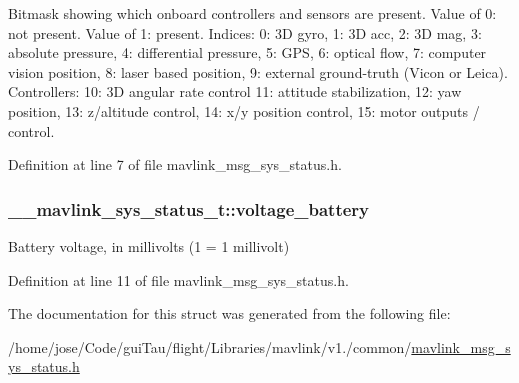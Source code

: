 Bitmask showing which onboard controllers and sensors are present. Value of 0\-: not present. Value of 1\-: present. Indices\-: 0\-: 3\-D gyro, 1\-: 3\-D acc, 2\-: 3\-D mag, 3\-: absolute pressure, 4\-: differential pressure, 5\-: G\-P\-S, 6\-: optical flow, 7\-: computer vision position, 8\-: laser based position, 9\-: external ground-\/truth (Vicon or Leica). Controllers\-: 10\-: 3\-D angular rate control 11\-: attitude stabilization, 12\-: yaw position, 13\-: z/altitude control, 14\-: x/y position control, 15\-: motor outputs / control. 



Definition at line 7 of file mavlink\-\_\-msg\-\_\-sys\-\_\-status.\-h.

\hypertarget{struct____mavlink__sys__status__t_a47f55c2ec3aeb48c924092e2a46ffc99}{
\subsubsection[{voltage\-\_\-battery}]{ \-\_\-\-\_\-mavlink\-\_\-sys\-\_\-status\-\_\-t\-::voltage\-\_\-battery}}\label{struct____mavlink__sys__status__t_a47f55c2ec3aeb48c924092e2a46ffc99}


Battery voltage, in millivolts (1 = 1 millivolt) 



Definition at line 11 of file mavlink\-\_\-msg\-\_\-sys\-\_\-status.\-h.



The documentation for this struct was generated from the following file\-:\begin{DoxyCompactItemize}
\item 
/home/jose/\-Code/gui\-Tau/flight/\-Libraries/mavlink/v1./common/\hyperlink{mavlink__msg__sys__status_8h}{mavlink\-\_\-msg\-\_\-sys\-\_\-status.\-h}\end{DoxyCompactItemize}
